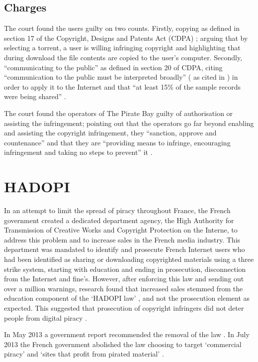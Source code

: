 \begin{appendices}
\subsection{Charges}
The court found the users guilty on two counts. Firstly, copying as defined in section 17 of the Copyright, Designs and Patents Act (CDPA) \citep{cdpa}; arguing that by selecting a torrent, a user is willing infringing copyright and highlighting that during download the file contents are copied to the user's computer. Secondly, ``communicating to the public'' as defined in section 20 of CDPA, citing  ``communication to the public must be interpreted broadly'' (\citet[47.]{courtofjustice2012} as cited in \citet{bpivsukisps}) in order to apply it to the Internet and that ``at least 15\% of the sample records were being shared'' \citep{bpivsukisps}.

The court found the operators of The Pirate Bay guilty of authorisation or assisting the infringement; pointing out that the operators go far beyond enabling and assisting the copyright infringement, 
 they ``sanction, approve and countenance'' and that they are ``providing means to infringe, encouraging infringement and taking no steps to prevent'' it \citep{bpivsukisps}.

\section{HADOPI} \label{app:hadopi}

In an attempt to limit the spread of piracy throughout France, the French government created a dedicated department agency, the High Authority for Transmission of Creative Works and Copyright Protection on the Interne, to address this problem and to increase sales in the French media industry.
This department was mandated to identify and prosecute French Internet users who had been identified as sharing or downloading copyrighted materials using a three strike system, starting with education and ending in prosecution, disconnection from the Internet and fine's.
However, after enforcing this law and sending out over a million warnings, research found that increased sales stemmed from the education component of the `HADOPI law' \citep{danaher2012hadopi}, and not the prosecution element as expected. This suggested that prosecution of copyright infringers did not deter people from digital piracy \citep{peoples2012hadopi}. 

In May 2013 a government report recommended the removal of the law \citep{lescure2013}. In July 2013 the French government abolished the law choosing to target `commercial piracy' and `sites that profit from pirated material' \citet{guardian2013hadopi}.


\end{appendices}
